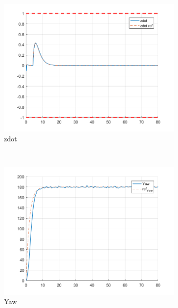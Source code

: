 \documentclass[11pt]{article}
\begin{document}
\begin{enumerate}
\begin{figure}[ht]
        \begin{subfigure}[c]{0.3\linewidth}
            \centering
            \includegraphics[width=\linewidth]{Plots_12_NonlinearModel_Hexagon/04}
            \caption{zdot}
        \end{subfigure}
        ~
        \begin{subfigure}[c]{0.3\linewidth}
            \centering
            \includegraphics[width=\linewidth]{Plots_12_NonlinearModel_Hexagon/05}
            \caption{Yaw}
        \end{subfigure}
        ~
        \begin{subfigure}[c]{0.3\linewidth}
            \centering

\end{subfigure}
\end{figure}
\end{enumerate}
\end{document}
